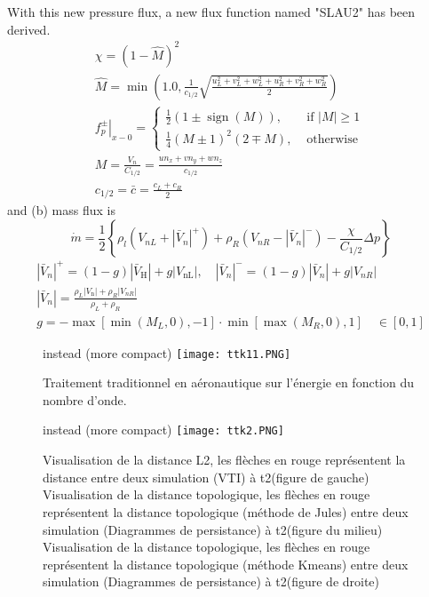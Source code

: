 With this new pressure flux, a new flux function named "SLAU2" has been derived.
$$\begin{array}{l}
\chi=(1-\hat{M})^{2} \\
\hat{M}=\min \left(1.0, \frac{1}{c_{1 / 2}} \sqrt{\frac{u_{L}^{2}+v_{L}^{2}+w_{L}^{2}+u_{R}^{2}+v_{R}^{2}+w_{R}^{2}}{2}}\right) \\
\left.f_{p}^{\pm}\right|_{x-0}=\left\{\begin{array}{ll}
\frac{1}{2}(1 \pm \operatorname{sign}(M)), & \text { if }|M| \geqslant 1 \\
\frac{1}{4}(M \pm 1)^{2}(2 \mp M), & \text { otherwise }
\end{array}\right. \\
M=\frac{V_{n}}{C_{1 / 2}}=\frac{u n_{x}+v n_{y}+w n_{z}}{c_{1 / 2}} \\
c_{1 / 2}=\bar{c}=\frac{c_{L}+c_{R}}{2}
\end{array}
$$
and (b) mass flux is
$$
\dot{m}=\frac{1}{2}\left\{\rho_{l}\left(V_{n L}+\left|\bar{V}_{n}\right|^{+}\right)+\rho_{R}\left(V_{n R}-\left|\bar{V}_{n}\right|^{-}\right)-\frac{\chi}{C_{1 / 2}} \Delta p\right\}
$$
$$
\begin{array}{l}
\left|\bar{V}_{n}\right|^{+}=(1-g)\left|\bar{V}_{\mathrm{H}}\right|+g\left|V_{\mathrm{nL}}\right|, \quad\left|\bar{V}_{n}\right|^{-}=(1-g)\left|\bar{V}_{n}\right|+g\left|V_{n R}\right| \\
\left|\bar{V}_{n}\right|=\frac{\rho_{L}\left|V_{\mathrm{n}}\right|+\rho_{R}\left|V_{n R}\right|}{\rho_{L}+\rho_{R}} \\
g=-\max \left[\min \left(M_{L}, 0\right),-1\right] \cdot \min \left[\max \left(M_{R}, 0\right), 1\right] \quad \in[0,1]
\end{array}
$$

\begin{figure}[H]
 \centering %
instead (more compact)
 \texttt{[image: ttk11.PNG]}
 \caption{ Traitement traditionnel en aéronautique sur l'énergie en fonction du
nombre d'onde.}
 \label{fig:sample}
\end{figure}


\begin{figure}[H]
 \centering %
instead (more compact)
 \texttt{[image: ttk2.PNG]}
 \caption{Visualisation de la distance L2, les flèches en rouge représentent la
distance entre deux simulation (VTI) à t2(figure de gauche)\\
 Visualisation de la distance topologique, les flèches en rouge représentent la
distance topologique (méthode de Jules) entre deux simulation (Diagrammes de
persistance) à t2(figure du milieu)\\
 Visualisation de la distance topologique, les flèches en rouge représentent la
distance topologique (méthode Kmeans) entre deux simulation (Diagrammes de
persistance) à t2(figure de droite)}
 \label{fig:sample}
\end{figure}



